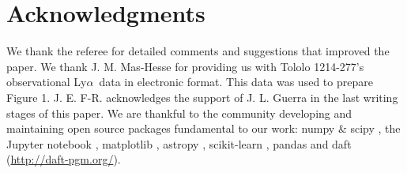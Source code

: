 \documentclass[a4paper,fleqn,usenatbib]{mnras}
\newcommand{\tol}{Tololo 1214-277}
\newcommand{\lya}{\ifmmode{{\rm Ly}\alpha}\else Ly$\alpha$\ \fi}
\begin{document}
\section*{Acknowledgments}
We thank the referee for detailed comments and suggestions that
improved the paper. 
We thank J. M. Mas-Hesse for providing us with \tol's observational
\lya data \citep{mashesse03} in electronic format. This data was
used to prepare Figure 1.
J. E. F-R. acknowledges the support of J. L. Guerra in the last
writing stages of this paper.
We are thankful to the community developing and maintaining open source
packages fundamental to our work: numpy \& scipy \citep{numpy}, the
Jupyter notebook \citep{IPython,jupyter}, matplotlib
\citep{matplotlib}, astropy \citep{astropy},  scikit-learn
\citep{scikit-learn}, pandas \citep{pandas} and daft
(\url{http://daft-pgm.org/}).  
\end{document}
